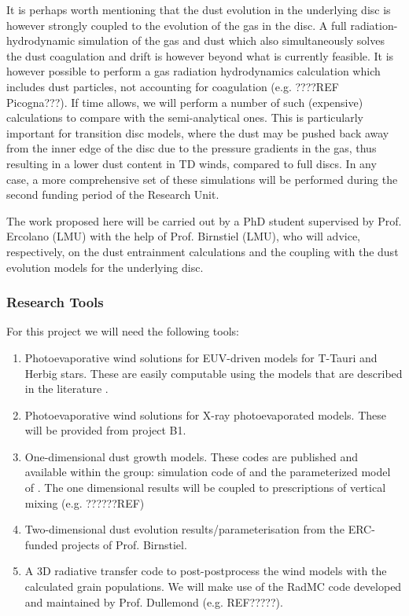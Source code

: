 \documentclass[10pt,fleqn,twoside]{article}
\begin{document}
It is perhaps worth mentioning that the dust evolution in the
underlying disc is however strongly coupled to the evolution of the gas
in the disc. A full radiation-hydrodynamic simulation of the gas and
dust which also simultaneously solves the dust coagulation and drift
is however beyond what is currently feasible. It is however possible
to perform a gas radiation hydrodynamics calculation which includes
dust particles, not accounting for coagulation (e.g. ????REF
Picogna???). If time allows, we will perform a number of such
(expensive) calculations to compare with the semi-analytical
ones. This is particularly important for transition disc models, where
the dust may be pushed back away from the inner edge of the disc due
to the pressure gradients in the gas, thus resulting in a  lower dust
content in TD winds, compared to full discs.  In any case, a more
comprehensive set of these simulations will be performed during the
second funding period of the Research Unit.  


The work proposed here will be carried out by a PhD student supervised by
Prof. Ercolano (LMU) with the help of Prof. Birnstiel (LMU), who will
advice, respectively, on the dust entrainment calculations and the 
coupling with the dust evolution models for the underlying disc. 

\subsubsection{Research Tools}

For this project we will need the following tools:
\begin{enumerate}
\item Photoevaporative wind solutions for EUV-driven
models for T-Tauri and Herbig stars. These are easily computable 
using the models that are described in the literature \citep[e.g.,][]{2004ApJ...607..890F}.
\item Photoevaporative wind solutions for X-ray photoevaporated
models. These will be provided from project B1.
\item One-dimensional dust growth models. These codes are published
and available within the group: simulation code of 
 \citet{2010A&A...513A..79B} and the parameterized model of
 \citet{2012A&A...539A.148B}. The one dimensional results will be
 coupled to prescriptions of vertical mixing (e.g. ??????REF)
\item Two-dimensional dust evolution results/parameterisation from the
  ERC-funded projects of Prof. Birnstiel.
\item A 3D radiative transfer code to post-postprocess the wind
models with the calculated grain populations. We will make use  of the
RadMC code developed and maintained by Prof. Dullemond (e.g. REF?????).
\end{enumerate}
\end{document}
